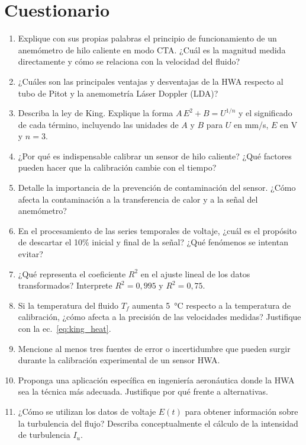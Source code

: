 \documentclass[12pt,a4paper]{article}
\begin{document}
\section{Cuestionario}
\label{sec:cuestionario}

\begin{enumerate}
	\item Explique con sus propias palabras el principio de funcionamiento de
	      un anemómetro de hilo caliente en modo CTA\@.  ¿Cuál es la magnitud
	      medida directamente y cómo se relaciona con la velocidad del fluido?

	\item ¿Cuáles son las principales ventajas y desventajas de la HWA
	      respecto al tubo de Pitot y la anemometría Láser Doppler (LDA)?

	\item Describa la ley de King.  Explique la forma
	      $A\,E^2 + B = U^{1/n}$ y el significado de cada término, incluyendo
	      las unidades de $A$ y $B$ para $U$ en mm/s, $E$ en V y $n = 3$.

	\item ¿Por qué es indispensable calibrar un sensor de hilo caliente?
	      ¿Qué factores pueden hacer que la calibración cambie con el tiempo?

	\item Detalle la importancia de la prevención de contaminación del
	      sensor.  ¿Cómo afecta la contaminación a la transferencia de calor
	      y a la señal del anemómetro?

	\item En el procesamiento de las series temporales de voltaje, ¿cuál es
	      el propósito de descartar el 10\% inicial y final de la señal?
	      ¿Qué fenómenos se intentan evitar?

	\item ¿Qué representa el coeficiente $R^2$ en el ajuste lineal de los
	      datos transformados?  Interprete $R^2 = 0{,}995$ y $R^2 = 0{,}75$.

	\item Si la temperatura del fluido $T_f$ aumenta \SI{5}{\degreeCelsius}
	      respecto a la temperatura de calibración, ¿cómo afecta a la
	      precisión de las velocidades medidas?  Justifique con la
	      ec.~\eqref{eq:king_heat}.

	\item Mencione al menos tres fuentes de error o incertidumbre que pueden
	      surgir durante la calibración experimental de un sensor HWA.

	\item Proponga una aplicación específica en ingeniería aeronáutica donde
	      la HWA sea la técnica más adecuada.  Justifique por qué frente a
	      alternativas.

	\item ¿Cómo se utilizan los datos de voltaje $E(t)$ para obtener
	      información sobre la turbulencia del flujo?  Describa
	      conceptualmente el cálculo de la intensidad de turbulencia $I_u$.
\end{enumerate}
\end{document}
